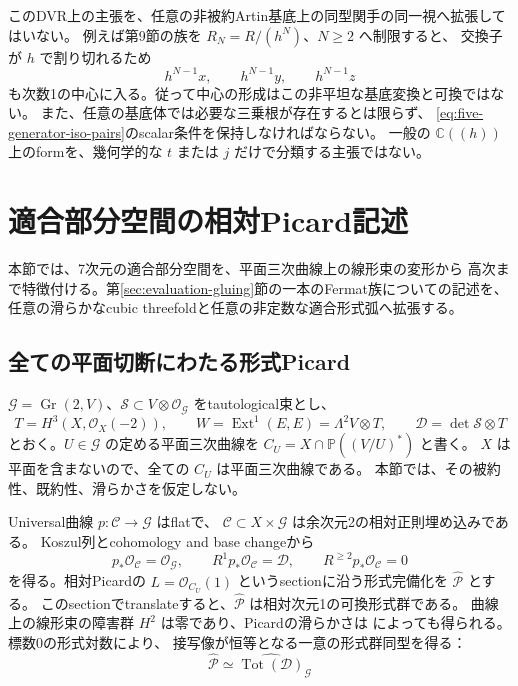 \documentclass[a4paper,11pt]{ltjsarticle}
\theoremstyle{definition}
\newcommand{\CC}{\mathbb C}
\newcommand{\OO}{\mathcal O}
\newcommand{\PP}{\mathbb P}
\newcommand{\Gr}{\operatorname{Gr}}
\newcommand{\Ext}{\operatorname{Ext}}
\begin{document}
このDVR上の主張を、任意の非被約Artin基底上の同型関手の同一視へ拡張してはいない。
例えば第9節の族を $R_N=R/(h^N)$、$N\ge2$ へ制限すると、
交換子が $h$ で割り切れるため
\[
 h^{N-1}x,\qquad h^{N-1}y,\qquad h^{N-1}z
\]
も次数1の中心に入る。従って中心の形成はこの非平坦な基底変換と可換ではない。
また、任意の基底体では必要な三乗根が存在するとは限らず、
\eqref{eq:five-generator-iso-pairs}のscalar条件を保持しなければならない。
一般の $\CC((h))$ 上のformを、幾何学的な $t$ または $j$ だけで分類する主張ではない。

\section{適合部分空間の相対Picard記述}\label{sec:picard-compatibility}

本節では、7次元の適合部分空間を、平面三次曲線上の線形束の変形から
高次まで特徴付ける。第\ref{sec:evaluation-gluing}節の一本のFermat族についての記述を、
任意の滑らかなcubic threefoldと任意の非定数な適合形式弧へ拡張する。

\subsection{全ての平面切断にわたる形式Picard}

$\mathcal G=\Gr(2,V)$、$\mathcal S\subset V\otimes\OO_{\mathcal G}$ をtautological束とし、
\[
 T=H^3(X,\OO_X(-2)),\qquad
 W=\Ext^1(E,E)=\Lambda^2V\otimes T,\qquad
 \mathcal D=\det\mathcal S\otimes T
\]
とおく。$U\in\mathcal G$ の定める平面三次曲線を
$C_U=X\cap\PP((V/U)^*)$ と書く。
$X$ は平面を含まないので、全ての $C_U$ は平面三次曲線である。
本節では、その被約性、既約性、滑らかさを仮定しない。

Universal曲線 $p:\mathcal C\to\mathcal G$ はflatで、
$\mathcal C\subset X\times\mathcal G$ は余次元2の相対正則埋め込みである。
Koszul列とcohomology and base changeから
\[
 p_*\OO_{\mathcal C}=\OO_{\mathcal G},\qquad
 R^1p_*\OO_{\mathcal C}=\mathcal D,\qquad
 R^{\ge2}p_*\OO_{\mathcal C}=0
\]
を得る。相対Picardの $L=\OO_{C_U}(1)$ というsectionに沿う形式完備化を
$\widehat{\mathcal P}$ とする。
このsectionでtranslateすると、$\widehat{\mathcal P}$ は相対次元1の可換形式群である。
曲線上の線形束の障害群 $H^2$ は零であり、Picardの滑らかさは
\cite[Tag 0DPJ]{StacksPicardSmooth}によっても得られる。
標数0の形式対数\cite[Appendix A.2, Proposition A.2.2]{PicardFormal}により、
接写像が恒等となる一意の形式群同型を得る：
\begin{equation}\label{eq:relative-picard-log}
 \widehat{\mathcal P}
 \simeq\widehat{\operatorname{Tot}(\mathcal D)}_{\mathcal G}
\end{equation}
\end{document}
